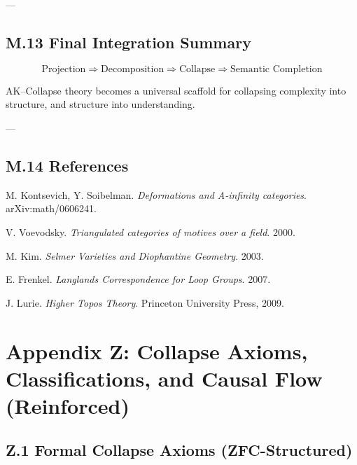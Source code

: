 \documentclass[11pt]{article}
\begin{document}
\begin{axiom}
\begin{axiom}
{{---

\subsection*{M.13 Final Integration Summary}

\[
\text{Projection} \Rightarrow \text{Decomposition} \Rightarrow \text{Collapse} \Rightarrow \text{Semantic Completion}
\]

AK–Collapse theory becomes a universal scaffold for collapsing complexity  
into structure, and structure into understanding.

---

\subsection*{M.14 References}

\begin{thebibliography}{9}

M. Kontsevich, Y. Soibelman.  
\textit{Deformations and A-infinity categories}. arXiv:math/0606241.

V. Voevodsky.  
\textit{Triangulated categories of motives over a field}. 2000.

M. Kim.  
\textit{Selmer Varieties and Diophantine Geometry}. 2003.

E. Frenkel.  
\textit{Langlands Correspondence for Loop Groups}. 2007.

J. Lurie.  
\textit{Higher Topos Theory}. Princeton University Press, 2009.

\end{thebibliography}



\section*{Appendix Z: Collapse Axioms, Classifications, and Causal Flow (Reinforced)}

\subsection*{Z.1 Formal Collapse Axioms (ZFC-Structured)}

}}
\end{axiom}
\end{axiom}
\end{document}
